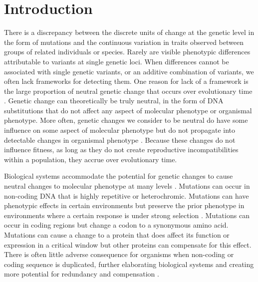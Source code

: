 \chapter*{Introduction}


There is a discrepancy between the discrete units of change at the genetic level in the form of mutations and the continuous variation in traits observed between groups of related individuals or species. Rarely are visible phenotypic differences attributable to variants at single genetic loci. When differences cannot be associated with single genetic variants, or an additive combination of variants, we often lack frameworks for detecting them. One reason for lack of a framework is the large proportion of neutral genetic change that occurs over evolutionary time \cite{kimura1985neutral, Nei2010}. Genetic change can theoretically be truly neutral, in the form of DNA substitutions that do not affect any aspect of molecular phenotype or organismal phenotype. More often, genetic changes we consider to be neutral do have some influence on some aspect of molecular phenotype but do not propagate into detectable changes in organismal phenotype \cite{Boyle2017}. Because these changes do not influence fitness, as long as they do not create reproductive incompatibilities within a population, they accrue over evolutionary time.

Biological systems accommodate the potential for genetic changes to cause neutral changes to molecular phenotype at many levels \cite{Laruson2020}. Mutations can occur in non-coding DNA that is highly repetitive or heterochromic. Mutations can have phenotypic effects in certain environments but preserve the prior phenotype in environments where a certain response is under strong selection \cite{Paaby2014}. Mutations can occur in coding regions but change a codon to a synonymous amino acid. Mutations can cause a change to a protein that does affect its function or expression in a critical window but other proteins can compensate for this effect. There is often little adverse consequence for organisms when non-coding or coding sequence is duplicated, further elaborating biological systems and creating more potential for redundancy and compensation \cite{ohno1970duplication, Zhang2003, KellisM2004, DeSmet2012}.

